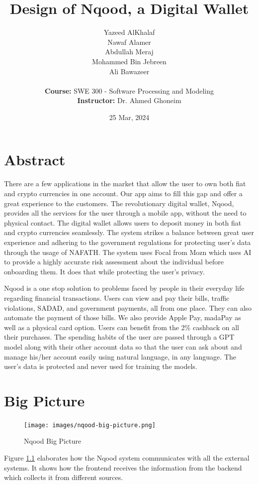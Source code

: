 \documentclass[a4paper]{report}
\title{Design of Nqood, a Digital Wallet}
\author{
    Yazeed AlKhalaf \\
    Nawaf Alamer  \\
    Abdullah Meraj \\
    Mohammed Bin Jebreen \\
    Ali Bawazeer \\
    \\
    \textbf{Course:} SWE 300 - Software Processing and Modeling \\
    \textbf{Instructor:} Dr. Ahmed Ghoneim
}
\date{25 Mar, 2024}
\begin{document}
\maketitle

\newpage

\tableofcontents

\chapter*{Abstract}

There are a few applications in the market that allow the user to own both fiat and crypto currencies in one account. Our app aims to fill this gap and offer a great experience to the customers. The revolutionary digital wallet, Nqood, provides all the services for the user through a mobile app, without the need to physical contact. The digital wallet allows users to deposit money in both fiat and crypto currencies seamlessly. The system strikes a balance between great user experience and adhering to the government regulations for protecting user’s data through the usage of NAFATH. The system uses Focal from Mozn which uses AI to provide a highly accurate risk assessment about the individual before onboarding them. It does that while protecting the user’s privacy.

Nqood is a one stop solution to problems faced by people in their everyday life regarding financial transactions. Users can view and pay their bills, traffic violations, SADAD, and government payments, all from one place. They can also automate the payment of those bills. We also provide Apple Pay, madaPay as well as a physical card option. Users can benefit from the 2\% cashback on all their purchases. The spending habits of the user are passed through a GPT model along with their other account data so that the user can ask about and manage his/her account easily using natural language, in any language. The user’s data is protected and never used for training the models.

\chapter{Big Picture}

\begin{figure}[h!]
    \centering
    \texttt{[image: images/nqood-big-picture.png]}
    \caption{Nqood Big Picture}
    \label{fig:big-picture}
\end{figure}

Figure \ref{fig:big-picture} elaborates how the Nqood system communicates with all the external systems. It shows how the frontend receives the information from the backend which collects it from different sources.
\end{document}
